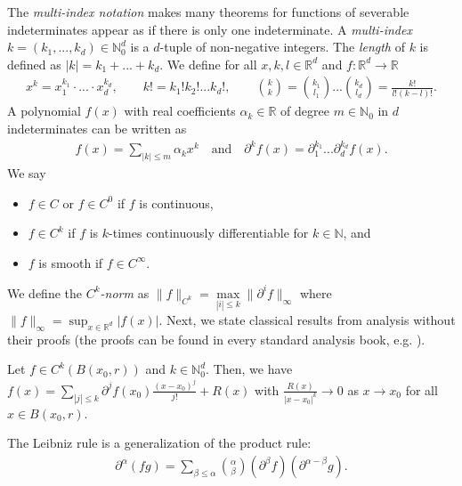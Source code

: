 The \emph{multi-index notation} makes many theorems for functions of severable indeterminates appear as if there is only one indeterminate. A \emph{multi-index} $k = (k_1,...,k_d) \in \mathbb{N}^d_0$ is a $d$-tuple of non-negative integers. The \emph{length} of $k$ is defined as $|k| = k_1 + ... + k_d$. We define for all $x, k,l \in \mathbb{R}^d$ and $f: \mathbb{R}^d \to \mathbb{R}$
\begin{gather*}
    x^k = x_1^{k_1} \cdot ... \cdot x_d^{k_d}, \qquad
    k! = k_1! k_2! ... k_d!, \qquad
    {k \choose k} = {k_1 \choose l_1} ... {k_d \choose l_d} = \frac{k!}{l! (k - l)!}.
\end{gather*}
A polynomial $f(x)$ with real coefficients $\alpha_k \in \mathbb{R}$ of degree $m \in \mathbb{N}_0$ in $d$ indeterminates can be written as 
\begin{align*}
    f(x) = \sum\limits_{|k| \leq m} \alpha_{k}x^k  \quad \text{and} \quad
    \partial^k f(x) = \partial^{k_1}_{1} ... \partial^{k_d}_{d} f(x).
\end{align*}
We say 
\begin{itemize}
    \item $f \in C$ or $f \in C^0$ if $f$ is continuous,
    \item $f \in C^k$ if $f$ is {$k$-times continuously differentiable} for $k \in \mathbb{N}$, and
    \item $f$ is {smooth} if $f \in C^\infty$.
\end{itemize}
We define the \emph{$C^k$-norm} as $\lVert f \rVert_{C^k} = \max\limits_{|i| \leq k} \lVert \partial^i f \rVert_\infty$ where $\lVert f \rVert_{\infty} = \sup_{x \in \mathbb{R}^d} |f(x)|$. Next, we state classical results from analysis without their proofs (the proofs can be found in every standard analysis book, e.g. \cite{MR0055409}).
\begin{theorem}
    Let $f \in C^{k}(B(x_0, r))$ and $k \in \mathbb{N}^d_0$. Then, we have $f(x) = \sum\limits_{|j| \leq k}\partial^{j} f(x_0) \frac{(x-x_0)^j}{j!} + R(x)$ with $\frac{R(x)}{|x-x_0|^{k}} \to 0$ as $x \to x_0$ for all $x \in B(x_0, r)$.
\end{theorem}

\begin{theorem}\label{theorem:leibniz}
    The Leibniz rule is a generalization of the product rule:
    \begin{align*}
        \partial^\alpha(fg) = \sum_{\beta \leq \alpha} {\alpha \choose \beta} (\partial^\beta f) (\partial^{\alpha - \beta} g).
    \end{align*}
\end{theorem}


